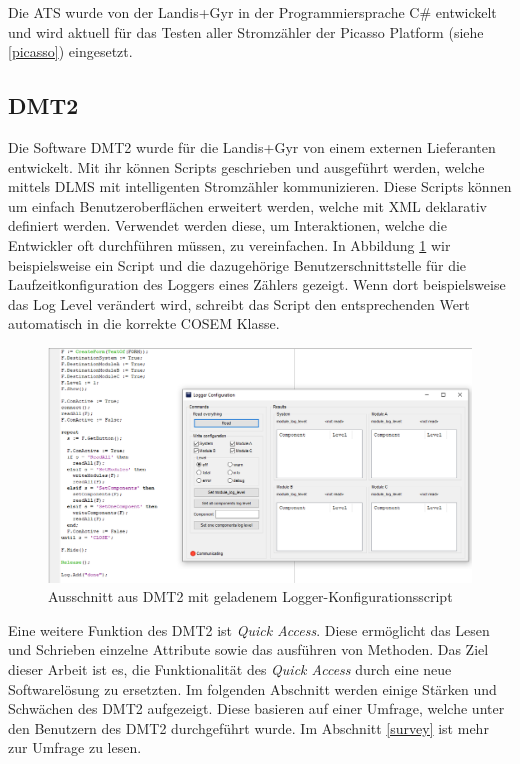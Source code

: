 Die \ac{ATS} wurde von der Landis+Gyr in der Programmiersprache C\# entwickelt und wird aktuell für das Testen aller Stromzähler der Picasso Platform (siehe \ref{picasso}) eingesetzt.



\subsection{DMT2}\label{dmt}
Die Software \ac{DMT2} wurde für die Landis+Gyr von einem externen Lieferanten entwickelt.
Mit ihr können Scripts geschrieben und ausgeführt werden, welche mittels \ac{DLMS} mit intelligenten Stromzähler kommunizieren.
Diese Scripts können um einfach Benutzeroberflächen erweitert werden, welche mit XML deklarativ definiert werden.
Verwendet werden diese, um Interaktionen, welche die Entwickler oft durchführen müssen, zu vereinfachen.
In Abbildung \ref{fig:dmt2logger} wir beispielsweise ein Script und die dazugehörige Benutzerschnittstelle für die Laufzeitkonfiguration des Loggers eines Zählers gezeigt.
Wenn dort beispielsweise das Log Level verändert wird, schreibt das Script den entsprechenden Wert automatisch in die korrekte \ac{COSEM} Klasse.
\begin{figure}[H]
   \centering
   \includegraphics[width=1.0\textwidth]{gfx/dmt2logger.png}
   \caption{
      Ausschnitt aus \ac{DMT2} mit geladenem Logger-Konfigurationsscript
   }
   \label{fig:dmt2logger}
\end{figure}

Eine weitere Funktion des \ac{DMT2} ist \textit{Quick Access}.
Diese ermöglicht das Lesen und Schrieben einzelne Attribute sowie das ausführen von Methoden.
Das Ziel dieser Arbeit ist es, die Funktionalität des \textit{Quick Access} durch eine neue Softwarelösung zu ersetzten.
Im folgenden Abschnitt werden einige Stärken und Schwächen des \ac{DMT2} aufgezeigt.
Diese basieren auf einer Umfrage, welche unter den Benutzern des \ac{DMT2} durchgeführt wurde.
Im Abschnitt \ref{survey} ist mehr zur Umfrage zu lesen.

